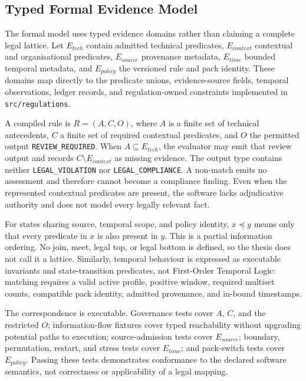 \subsection{Typed Formal Evidence Model}

The formal model uses typed evidence domains rather than claiming a complete legal lattice. Let $E_{tech}$ contain admitted technical predicates, $E_{context}$ contextual and organisational predicates, $E_{source}$ provenance metadata, $E_{time}$ bounded temporal metadata, and $E_{policy}$ the versioned rule and pack identity. These domains map directly to the predicate unions, evidence-source fields, temporal observations, ledger records, and regulation-owned constraints implemented in \texttt{src/regulations}.

A compiled rule is $R=(A,C,O)$, where $A$ is a finite set of technical antecedents, $C$ a finite set of required contextual predicates, and $O$ the permitted output \texttt{REVIEW\_REQUIRED}. When $A\subseteq E_{tech}$, the evaluator may emit that review output and records $C\setminus E_{context}$ as missing evidence. The output type contains neither \texttt{LEGAL\_VIOLATION} nor \texttt{LEGAL\_COMPLIANCE}. A non-match emits no assessment and therefore cannot become a compliance finding. Even when the represented contextual predicates are present, the software lacks adjudicative authority and does not model every legally relevant fact.

For states sharing source, temporal scope, and policy identity, $x\preceq y$ means only that every predicate in $x$ is also present in $y$. This is a partial information ordering. No join, meet, legal top, or legal bottom is defined, so the thesis does not call it a lattice. Similarly, temporal behaviour is expressed as executable invariants and state-transition predicates, not First-Order Temporal Logic: matching requires a valid active profile, positive window, required multiset counts, compatible pack identity, admitted provenance, and in-bound timestamps.

The correspondence is executable. Governance tests cover $A$, $C$, and the restricted $O$; information-flow fixtures cover typed reachability without upgrading potential paths to execution; source-admission tests cover $E_{source}$; boundary, permutation, restart, and stress tests cover $E_{time}$; and pack-switch tests cover $E_{policy}$. Passing these tests demonstrates conformance to the declared software semantics, not correctness or applicability of a legal mapping.
